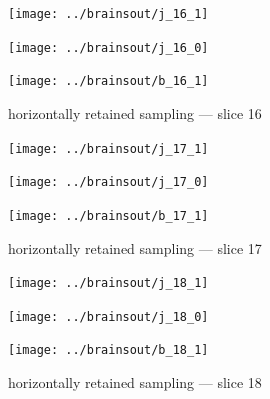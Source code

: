 \documentclass{article}
\begin{document}
\begin{figure}
\begin{centering}

\parbox{\imsize}{\texttt{[image: ../brainsout/j\_16\_1]}}

\vspace{\vertsep}

\parbox{\imsize}{\texttt{[image: ../brainsout/j\_16\_0]}}

\vspace{\vertsep}

\parbox{\imsize}{\texttt{[image: ../brainsout/b\_16\_1]}}

\end{centering}
\caption{horizontally retained sampling --- slice 16}
\end{figure}


\begin{figure}
\begin{centering}

\parbox{\imsize}{\texttt{[image: ../brainsout/j\_17\_1]}}

\vspace{\vertsep}

\parbox{\imsize}{\texttt{[image: ../brainsout/j\_17\_0]}}

\vspace{\vertsep}

\parbox{\imsize}{\texttt{[image: ../brainsout/b\_17\_1]}}

\end{centering}
\caption{horizontally retained sampling --- slice 17}
\end{figure}


\begin{figure}
\begin{centering}

\parbox{\imsize}{\texttt{[image: ../brainsout/j\_18\_1]}}

\vspace{\vertsep}

\parbox{\imsize}{\texttt{[image: ../brainsout/j\_18\_0]}}

\vspace{\vertsep}

\parbox{\imsize}{\texttt{[image: ../brainsout/b\_18\_1]}}

\end{centering}
\caption{horizontally retained sampling --- slice 18}
\end{figure}
\end{document}

